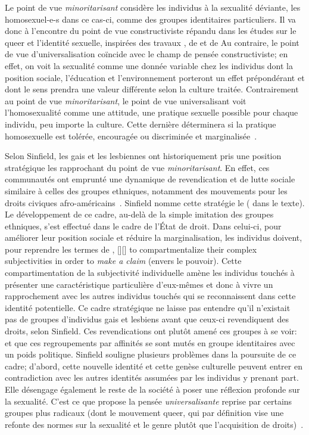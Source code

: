 Le point de vue \emph{minoritarisant} considère les individus à la sexualité déviante, les homosexuel-e-s dans ce cas-ci, comme des groupes identitaires particuliers. 
Il va donc à l'encontre du point de vue constructiviste répandu dans les études sur le queer et l'identité sexuelle, inspirées des travaux \citet{Foucault2011}, de \citet{Rubin2010} et de \citet{Butler2007} 
Au contraire, le point de vue d'universalisation coïncide avec le champ de pensée constructiviste; en effet, on voit la sexualité comme une donnée variable chez les individus dont la position sociale, l'éducation et l'environnement porteront un effet prépondérant et dont le sens prendra une valeur différente selon la culture traitée. 
Contrairement au point de vue \emph{minoritarisant}, le point de vue universalisant voit l'homosexualité comme une attitude, une pratique sexuelle possible pour chaque individu, peu importe la culture. 
Cette dernière déterminera si la pratique homosexuelle est tolérée, encouragée ou discriminée et marginalisée~\citep[271]{Sinfield1996}.

Selon Sinfield, les gais et les lesbiennes ont historiquement pris une position stratégique les rapprochant du point de vue \emph{minoritarisant}.
En effet, ces communautés ont emprunté une dynamique de revendication et de lutte sociale similaire à celles des groupes ethniques, notamment des mouvements pour les droits civiques afro-américains~\citep[271]{Sinfield1996}. 
Sinfield nomme cette stratégie le  ( dans le texte). 
Le développement de ce cadre, au-delà de la simple imitation des groupes ethniques, s'est effectué dans le cadre de l'État de droit. 
Dans celui-ci, pour améliorer leur position sociale et réduire la marginalisation, les individus doivent, pour reprendre les termes de \citet{Sinfield1996}, [{\citeyear[272]{Sinfield1996}}][]{\textelp{} to   compartmentalize their complex subjectivities in order to \emph{make a claim} (envers le pouvoir)}.
Cette compartimentation de la subjectivité individuelle amène les individus touchés à présenter une caractéristique particulière d'eux-mêmes et donc à vivre un rapprochement avec les autres individus touchés qui se reconnaissent dans cette identité potentielle. 
Ce cadre stratégique ne laisse pas entendre qu'il n'existait pas de groupes d'individus gais et lesbiens avant que ceux-ci revendiquent des droits, selon Sinfield. 
Ces revendications ont plutôt amené ces groupes à se voir:  ~\citep[272]{Sinfield1996} et que ces regroupements par affinités se sont mutés en groupe identitaires avec un poids politique. 
Sinfield souligne plusieurs problèmes dans la poursuite de ce cadre; d'abord, cette nouvelle identité et cette genèse culturelle peuvent entrer en contradiction avec les autres identités assumées par les individus y prenant part. 
Elle désengage également le reste de la société à poser une réflexion profonde sur la sexualité. 
C'est ce que propose la pensée \emph{universalisante} reprise par certains groupes plus radicaux (dont le mouvement queer, qui par définition vise une refonte des normes sur la sexualité et le genre plutôt que l'acquisition de droits)~\citep[273]{Sinfield1996}.

